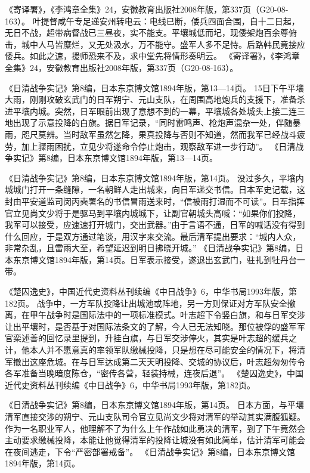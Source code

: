 \documentclass[12pt,UTF8]{ctexbook}
\begin{document}
《寄译署》，《李鸿章全集》24，安徽教育出版社2008年版，第337页（G20-08-163）。
叶提督咸午专足递安州转电云：电线已断，倭兵四面合围，自十二日起，无日不战，超带病督战已三昼夜，实不能支。平壤城低而圮，现倭架炮百余尊俯击，城中人马皆糜烂，又无处汲水，万不能守。盛军人多不足恃。后路韩民竟接应倭兵。如此之速，援师恐来不及，求中堂先将情形奏明云。 《寄译署》，《李鸿章全集》24，安徽教育出版社2008年版，第337页（G20-08-163）。

《日清战争实记》第8编，日本东京博文馆1894年版，第13—14页。
15日下午平壤大雨，刚刚攻破玄武门的日军朔宁、元山支队，在周围高地炮兵的支援下，准备杀进平壤内城。突然，日军眼前出现了意想不到的一幕，平壤城各处城头上接二连三地出现了示意投降的白旗。据日军记录，“同时雷鸣声、枪炮声混杂一处，伴随暴雨，咫尺莫辨。当时敌军虽然乞降，果真投降与否则不知道，然而我军已经战斗疲劳，加上骤雨困扰，立见少将遂命令停止炮击，观察敌军进一步行动”。 《日清战争实记》第8编，日本东京博文馆1894年版，第13—14页。

《日清战争实记》第8编，日本东京博文馆1894年版，第14页。
没过多久，平壤内城城门打开一条缝隙，一名朝鲜人走出城来，向日军递交书信。日本军史记载，这封由平安道监司闵丙奭署名的书信冒雨送来时，“信被雨打湿而不可读”。日军指挥官立见尚文少将于是驱马到平壤内城城下，让副官朝城头高喊：“如果你们投降，我军可以接受，应速速打开城门，交出武器。”由于言语不通，日军的喊话没有得到什么回应，于是双方通过笔谈，用汉字来交流。最后清军提出要求：“城内人众，非常杂乱，且雷雨大至，希望延迟到明日拂晓开城。” 《日清战争实记》第8编，日本东京博文馆1894年版，第14页。日军表示接受，遂退出玄武门，驻扎到牡丹台一带。

《楚囚逸史》，中国近代史资料丛刊续编《中日战争》6，中华书局1993年版，第182页。
战争中，一方军队投降让出城池或阵地，另一方则保证对方军队安全撤离，在甲午战争时是国际法中的一项标准模式。叶志超下令竖白旗，和与日军交涉让出平壤时，是否基于对国际法条文的了解，今人已无法知晓。那位被俘的盛军军官栾述善的回忆录里提到，升挂白旗，与日军交涉停火，其实是叶志超的缓兵之计，他本人并不愿意真的率领军队缴械投降，只是想在尽可能安全的情况下，将清军撤出这座危城。在与日军达成第二天天明投降、交城的协议后，叶志超匆匆传令各军准备当晚暗度陈仓，“密传各营，轻装持械，连夜后退”。 《楚囚逸史》，中国近代史资料丛刊续编《中日战争》6，中华书局1993年版，第182页。

《日清战争实记》第8编，日本东京博文馆1894年版，第14页。
日本方面，与平壤清军直接交涉的朔宁、元山支队司令官立见尚文少将对清军的举动其实满腹狐疑。作为一名职业军人，他理解不了为什么上午作战如此勇决的清军，到了下午竟然会主动要求缴械投降，本能让他觉得清军的投降让城没有如此简单，估计清军可能会在夜间逃走，下令“严密部署戒备”。 《日清战争实记》第8编，日本东京博文馆1894年版，第14页。
\end{document}
